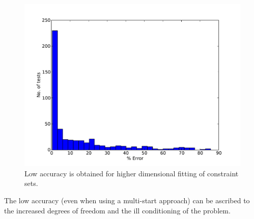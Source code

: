 \begin{figure}[htbp]
  \centering
    \includegraphics[width=\fullwidth]{graph/arbfitaccuracy2d.pdf}  
  \caption[Accuracy of constraint set fitting for 3 variables]{Low accuracy is obtained for higher dimensional fitting of constraint sets.}
  \label{fig:arbfitaccuracy3d}
\end{figure}

The low accuracy (even when using a multi-start approach) can be ascribed to the increased degrees of freedom and the ill conditioning of the problem.

